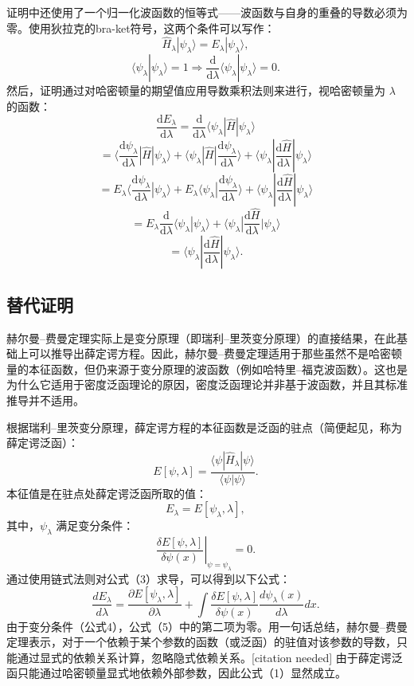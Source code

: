 证明中还使用了一个归一化波函数的恒等式——波函数与自身的重叠的导数必须为零。使用狄拉克的bra-ket符号，这两个条件可以写作：
\[
\hat{H}_{\lambda} |\psi_{\lambda} \rangle = E_{\lambda} |\psi_{\lambda} \rangle,~
\]
\[
\langle \psi_{\lambda} | \psi_{\lambda} \rangle = 1 \Rightarrow \frac{\mathrm{d}}{\mathrm{d} \lambda} \langle \psi_{\lambda} | \psi_{\lambda} \rangle = 0.~
\]
然后，证明通过对哈密顿量的期望值应用导数乘积法则来进行，视哈密顿量为 \(\lambda\) 的函数：
\[
\frac{\mathrm{d} E_{\lambda}}{\mathrm{d} \lambda} = \frac{\mathrm{d}}{\mathrm{d} \lambda} \langle \psi_{\lambda} | \hat{H} |\psi_{\lambda} \rangle~
\]
\[
= \langle \frac{\mathrm{d} \psi_{\lambda}}{\mathrm{d} \lambda} | \hat{H} | \psi_{\lambda} \rangle + \langle \psi_{\lambda} | \hat{H} | \frac{\mathrm{d} \psi_{\lambda}}{\mathrm{d} \lambda} \rangle + \langle \psi_{\lambda} | \frac{\mathrm{d} \hat{H}}{\mathrm{d} \lambda} | \psi_{\lambda} \rangle~
\]
\[
= E_{\lambda} \langle \frac{\mathrm{d} \psi_{\lambda}}{\mathrm{d} \lambda} | \psi_{\lambda} \rangle + E_{\lambda} \langle \psi_{\lambda} | \frac{\mathrm{d} \psi_{\lambda}}{\mathrm{d} \lambda} \rangle + \langle \psi_{\lambda} | \frac{\mathrm{d} \hat{H}}{\mathrm{d} \lambda} | \psi_{\lambda} \rangle~
\]
\[
= E_{\lambda} \frac{\mathrm{d}}{\mathrm{d} \lambda} \langle \psi_{\lambda} | \psi_{\lambda} \rangle + \langle \psi_{\lambda} | \frac{\mathrm{d} \hat{H}}{\mathrm{d} \lambda} | \psi_{\lambda} \rangle~
\]
\[
= \langle \psi_{\lambda} | \frac{\mathrm{d} \hat{H}}{\mathrm{d} \lambda} | \psi_{\lambda} \rangle.~
\]
\subsection{替代证明}
赫尔曼–费曼定理实际上是变分原理（即瑞利–里茨变分原理）的直接结果，在此基础上可以推导出薛定谔方程。因此，赫尔曼–费曼定理适用于那些虽然不是哈密顿量的本征函数，但仍来源于变分原理的波函数（例如哈特里–福克波函数）。这也是为什么它适用于密度泛函理论的原因，密度泛函理论并非基于波函数，并且其标准推导并不适用。

根据瑞利–里茨变分原理，薛定谔方程的本征函数是泛函的驻点（简便起见，称为薛定谔泛函）：
\[
E[\psi, \lambda] = \frac{\langle \psi | \hat{H}_{\lambda} | \psi \rangle}{\langle \psi | \psi \rangle}.~
\]
本征值是在驻点处薛定谔泛函所取的值：
\[
E_{\lambda} = E[\psi_{\lambda}, \lambda],~
\]
其中，\(\psi_{\lambda}\) 满足变分条件：
\[
\left. \frac{\delta E[\psi, \lambda]}{\delta \psi (x)} \right|_{\psi = \psi_{\lambda}} = 0.~
\]
通过使用链式法则对公式（3）求导，可以得到以下公式：
\[
\frac{d E_{\lambda}}{d \lambda} = \frac{\partial E[\psi_{\lambda}, \lambda]}{\partial \lambda} + \int \frac{\delta E[\psi, \lambda]}{\delta \psi(x)} \frac{d \psi_{\lambda}(x)}{d \lambda} dx.~
\]
由于变分条件（公式4），公式（5）中的第二项为零。用一句话总结，赫尔曼–费曼定理表示，对于一个依赖于某个参数的函数（或泛函）的驻值对该参数的导数，只能通过显式的依赖关系计算，忽略隐式依赖关系。[citation needed] 由于薛定谔泛函只能通过哈密顿量显式地依赖外部参数，因此公式（1）显然成立。
